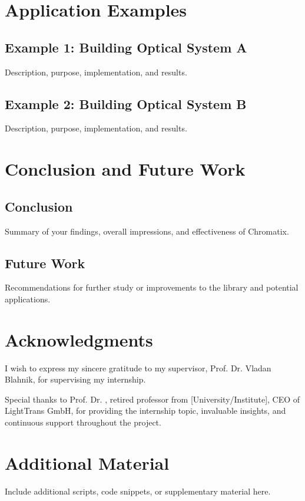 \documentclass[a4paper,12pt]{report}
\begin{document}
\chapter{Application Examples}
\section{Example 1: Building Optical System A}
Description, purpose, implementation, and results.

\section{Example 2: Building Optical System B}
Description, purpose, implementation, and results.

\chapter{Conclusion and Future Work}
\section{Conclusion}
Summary of your findings, overall impressions, and effectiveness of Chromatix.

\section{Future Work}
Recommendations for further study or improvements to the library and potential applications.

\chapter*{Acknowledgments}
I wish to express my sincere gratitude to my supervisor, Prof. Dr. Vladan Blahnik, for supervising my internship. 

Special thanks to Prof. Dr. , retired professor from [University/Institute], CEO of LightTrans GmbH, for providing the internship topic, invaluable insights, and continuous support throughout the project. 






\appendix
\chapter{Additional Material}
Include additional scripts, code snippets, or supplementary material here.
\end{document}
